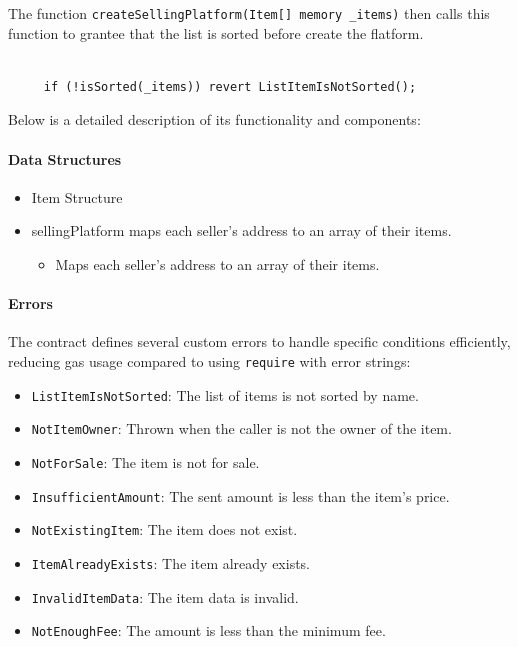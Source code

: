 \documentclass[runningheads]{llncs}
\begin{document}
The function \texttt{createSellingPlatform(Item[] memory \_items)}  then calls this function to grantee that the list is sorted before create the flatform.
\begin{lstlisting}[numbers=none]

     if (!isSorted(_items)) revert ListItemIsNotSorted();
\end{lstlisting}    
 Below is a detailed description of its functionality and components:

\paragraph{Data Structures}
\begin{itemize}
\item Item Structure


\item sellingPlatform maps each seller's address to an array of their items.
\begin{itemize}
    \item Maps each seller's address to an array of their items.
\end{itemize}
\end{itemize}
\paragraph{Errors}

The contract defines several custom errors to handle specific conditions efficiently, reducing gas usage compared to using \texttt{require} with error strings:
\begin{itemize}
    \item \texttt{ListItemIsNotSorted}: The list of items is not sorted by name.
    \item \texttt{NotItemOwner}: Thrown when the caller is not the owner of the item.
    \item \texttt{NotForSale}: The item is not for sale.
    \item \texttt{InsufficientAmount}: The sent amount is less than the item's price.
    \item \texttt{NotExistingItem}: The item does not exist.
    \item \texttt{ItemAlreadyExists}: The item already exists.
    \item \texttt{InvalidItemData}: The item data is invalid.
    \item \texttt{NotEnoughFee}: The amount is less than the minimum fee.
\end{itemize}
\end{document}
